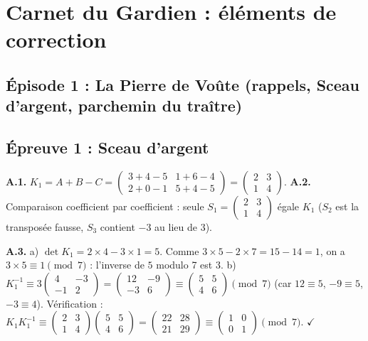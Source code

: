\documentclass[11pt,a4paper]{article}
\begin{document}
	\newpage
	\section*{\textcolor{argent}{Carnet du Gardien : éléments de correction}}
	
	\subsection*{Épisode 1 : La Pierre de Voûte (rappels, Sceau d'argent, parchemin du traître)}
	\subsection*{Épreuve 1 : Sceau d'argent}
	\textbf{A.1.} $K_1 = A + B - C
	= \begin{pmatrix}3+4-5 & 1+6-4\\ 2+0-1 & 5+4-5\end{pmatrix}
	= \begin{pmatrix}2&3\\1&4\end{pmatrix}$.\quad
	\textbf{A.2.} Comparaison coefficient par coefficient :
	seule $S_1 = \begin{pmatrix}2&3\\1&4\end{pmatrix}$ égale $K_1$
	($S_2$ est la transposée fausse, $S_3$ contient $-3$ au lieu de $3$).
	
	\textbf{A.3.} a) $\det K_1 = 2\times 4 - 3\times 1 = 5$.
	Comme $3\times 5 - 2\times 7 = 15 - 14 = 1$, on a
	$3\times 5 \equiv 1 \pmod 7$ : l'inverse de $5$ modulo 7 est $3$.
	b) $K_1^{-1} \equiv 3\begin{pmatrix}4&-3\\-1&2\end{pmatrix}
	= \begin{pmatrix}12&-9\\-3&6\end{pmatrix}
	\equiv \begin{pmatrix}5&5\\4&6\end{pmatrix} \pmod 7$
	(car $12\equiv 5$, $-9\equiv 5$, $-3\equiv 4$).
	Vérification :
	$K_1 K_1^{-1} \equiv \begin{pmatrix}2&3\\1&4\end{pmatrix}
	\begin{pmatrix}5&5\\4&6\end{pmatrix}
	= \begin{pmatrix}22&28\\21&29\end{pmatrix}
	\equiv \begin{pmatrix}1&0\\0&1\end{pmatrix} \pmod 7$. $\checkmark$
	
\end{document}
